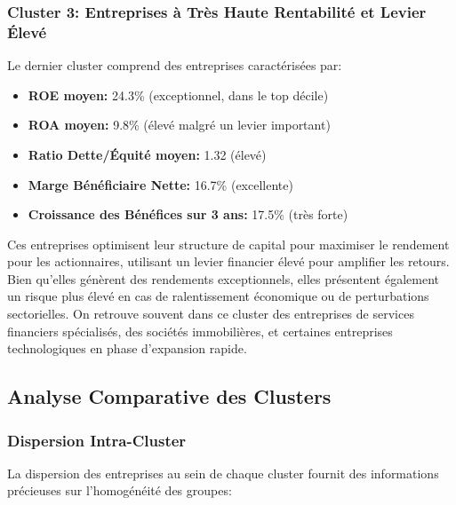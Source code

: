\documentclass[12pt]{article}
\begin{document}
\subsubsection{Cluster 3: Entreprises à Très Haute Rentabilité et Levier Élevé}
Le dernier cluster comprend des entreprises caractérisées par:
\begin{itemize}
    \item \textbf{ROE moyen:} 24.3\% (exceptionnel, dans le top décile)
    \item \textbf{ROA moyen:} 9.8\% (élevé malgré un levier important)
    \item \textbf{Ratio Dette/Équité moyen:} 1.32 (élevé)
    \item \textbf{Marge Bénéficiaire Nette:} 16.7\% (excellente)
    \item \textbf{Croissance des Bénéfices sur 3 ans:} 17.5\% (très forte)
\end{itemize}

Ces entreprises optimisent leur structure de capital pour maximiser le rendement pour les actionnaires, utilisant un levier financier élevé pour amplifier les retours. Bien qu'elles génèrent des rendements exceptionnels, elles présentent également un risque plus élevé en cas de ralentissement économique ou de perturbations sectorielles. On retrouve souvent dans ce cluster des entreprises de services financiers spécialisés, des sociétés immobilières, et certaines entreprises technologiques en phase d'expansion rapide.

\subsection{Analyse Comparative des Clusters}
\subsubsection{Dispersion Intra-Cluster}
La dispersion des entreprises au sein de chaque cluster fournit des informations précieuses sur l'homogénéité des groupes:
\end{document}
